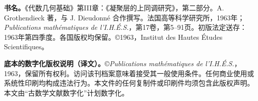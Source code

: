 \noindent\textbf{书名。}《代数几何基础》第III章：《凝聚层的上同调研究》，第二部分。A. Grothendieck 著，与 J. Dieudonné 合作撰写。法国高等科学研究所，1963年；\textit{Publications mathématiques de l'I.H.É.S.}，第17卷，第5--91页。初版法定送存：1963年第四季度。各国版权均保留。©1963，Institut des Hautes Études Scientifiques。

\noindent\textbf{底本的数字化版权说明（译文）。}©\textit{Publications mathématiques de l'I.H.É.S.}，1963，保留所有权利。访问该刊档案意味着接受其一般使用条件。任何商业使用或系统性印刷均构成违法行为。本文件的任何复制件或印刷件均须包含此版权声明。本文由“古数学文献数字化”计划数字化。



